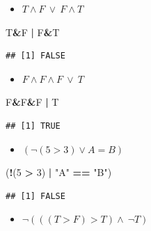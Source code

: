 \documentclass[12pt,a4paper]{article}
\newenvironment{Shaded}{\begin{snugshade}}{\end{snugshade}}
\newcommand{\DecValTok}[1]{\textcolor[rgb]{0.00,0.00,0.81}{#1}}
\newcommand{\NormalTok}[1]{#1}
\newcommand{\SpecialCharTok}[1]{\textcolor[rgb]{0.81,0.36,0.00}{\textbf{#1}}}
\newcommand{\StringTok}[1]{\textcolor[rgb]{0.31,0.60,0.02}{#1}}
\begin{document}
\begin{itemize}
  \item $T \land F \ \lor \ F \land T$
\end{itemize}

\begin{Shaded}
\begin{Highlighting}[]
\NormalTok{    T}\SpecialCharTok{\&}\NormalTok{F }\SpecialCharTok{|}\NormalTok{ F}\SpecialCharTok{\&}\NormalTok{T}
\end{Highlighting}
\end{Shaded}

\begin{verbatim}
## [1] FALSE
\end{verbatim}

\begin{itemize}
  \item $F \land F \land F\ \lor \ T$
\end{itemize}

\begin{Shaded}
\begin{Highlighting}[]
\NormalTok{    F}\SpecialCharTok{\&}\NormalTok{F}\SpecialCharTok{\&}\NormalTok{F }\SpecialCharTok{|}\NormalTok{ T}
\end{Highlighting}
\end{Shaded}

\begin{verbatim}
## [1] TRUE
\end{verbatim}

\begin{itemize}
  \item $(\neg (5 > 3) \lor A = B)$
\end{itemize}

\begin{Shaded}
\begin{Highlighting}[]
\NormalTok{    (}\SpecialCharTok{!}\NormalTok{(}\DecValTok{5} \SpecialCharTok{\textgreater{}} \DecValTok{3}\NormalTok{) }\SpecialCharTok{|} \StringTok{"A"} \SpecialCharTok{==} \StringTok{"B"}\NormalTok{) }
\end{Highlighting}
\end{Shaded}

\begin{verbatim}
## [1] FALSE
\end{verbatim}

\begin{itemize}
  \item $\neg(((T > F) > T) \land \ \neg T)$
\end{itemize}
\end{document}
